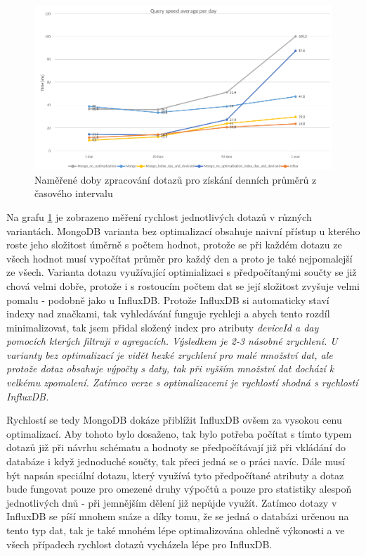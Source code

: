 \documentclass{article}
\begin{document}
\begin{figure}

    \includegraphics[width=20cm]{images/query_avg_all_graph.png}
    \centering   
    \caption{Naměřené doby zpracování dotazů pro získání denních průměrů z časového intervalu \label{graf:basic:avg}} 

\end{figure}


Na grafu \ref{graf:basic:avg} je zobrazeno měření rychlost jednotlivých dotazů v různých variantách. MongoDB varianta bez optimalizací obsahuje naivní přístup u kterého roste jeho složitost úměrně s počtem hodnot, protože se při každém dotazu ze všech hodnot musí vypočítat průměr pro každý den a proto je také nejpomalejší ze všech. Varianta dotazu využívající optimializaci s předpočítanými součty se již chová velmi dobře, protože i s rostoucím počtem dat se její složitost zvyšuje velmi pomalu - podobně jako u InfluxDB. Protože InfluxDB si automaticky staví indexy nad značkami, tak vyhledávání funguje rychleji a abych tento rozdíl minimalizovat, tak jsem přidal složený index pro atributy \it{deviceId} a \it{day} pomocích kterých filtruji v agregacích. Výsledkem je 2-3 násobné zrychlení. U varianty bez optimalizací je vidět hezké zrychlení pro malé množství dat, ale protože dotaz obsahuje výpočty s daty, tak při vyšším množství dat dochází k velkému zpomalení.  Zatímco verze s optimalizacemi je rychlostí shodná s rychlostí InfluxDB.

Rychlostí se tedy MongoDB dokáze přiblížit InfluxDB ovšem za vysokou cenu optimalizací. Aby tohoto bylo dosaženo, tak bylo potřeba počítat s tímto typem dotazů již při návrhu schématu a hodnoty se předpočítávají již při vkládání do databáze i když jednoduché součty, tak přeci jedná se o práci navíc. Dále musí být napsán speciální dotazu, který využívá tyto předpočítané atributy a dotaz bude fungovat pouze pro omezené druhy výpočtů a pouze pro statistiky alespoň jednotlivých dnů - při jemnějším dělení již nepůjde využít. Zatímco dotazy v InfluxDB se píší mnohem snáze a díky tomu, že se jedná o databázi určenou na tento typ dat, tak je také mnohém lépe optimalizována ohledně výkonosti a ve všech případech rychlost dotazů vycházela lépe pro InfluxDB.
\end{document}
